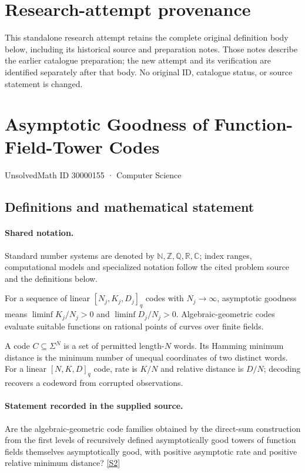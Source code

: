 \documentclass[11pt]{article}
\begin{document}
\section*{Research-attempt provenance}
This standalone research attempt retains the complete original definition body below,
including its historical source and preparation notes. Those notes describe the
earlier catalogue preparation; the new attempt and its verification are identified
separately after that body. No original ID, catalogue status, or source statement is changed.

\section{Asymptotic Goodness of Function-Field-Tower Codes}\label{30000155}
{\small UnsolvedMath ID 30000155 · Computer Science}
\subsection{Definitions and mathematical statement}

\paragraph{Shared notation.}Standard number systems are denoted by $\mathbb N,\mathbb Z,\mathbb Q,\mathbb R,\mathbb C$; index ranges, computational models and specialized notation follow the cited problem source and the definitions below.


For a sequence of linear $[N_j,K_j,D_j]_q$ codes with $N_j\to\infty$, asymptotic goodness means $\liminf K_j/N_j>0$ and $\liminf D_j/N_j>0$. Algebraic-geometric codes evaluate suitable functions on rational points of curves over finite fields.

A code $C\subseteq\Sigma^N$ is a set of permitted length-$N$ words. Its Hamming minimum distance is the minimum number of unequal coordinates of two distinct words. For a linear $[N,K,D]_q$ code, rate is $K/N$ and relative distance is $D/N$; decoding recovers a codeword from corrupted observations.
\paragraph{Statement recorded in the supplied source.}
Are the algebraic-geometric code families obtained by the direct-sum construction from the first levels of recursively defined asymptotically good towers of function fields themselves asymptotically good, with positive asymptotic rate and positive relative minimum distance? \href{https://doi.org/10.4171/owr/2004/54}{[S2]}
\end{document}
